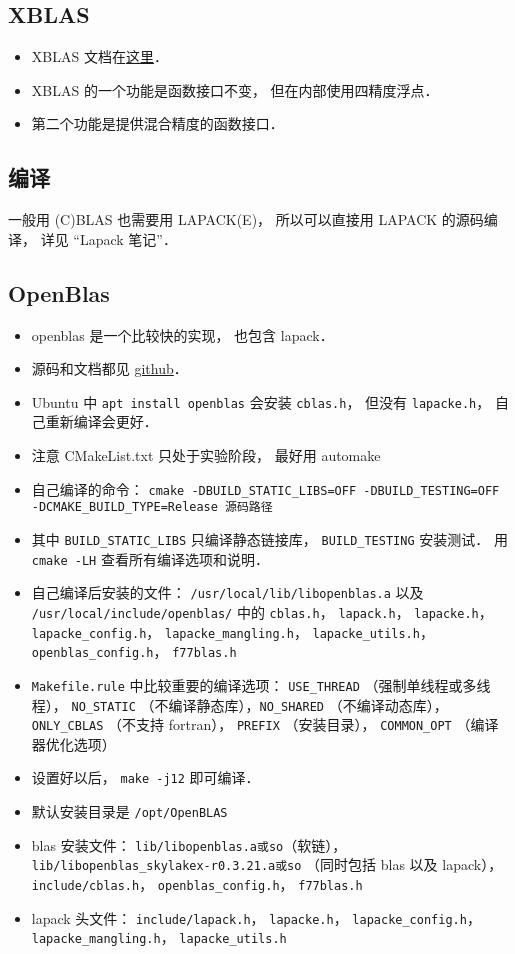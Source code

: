 \subsection{XBLAS}
\begin{itemize}
\item XBLAS 文档在\href{https://netlib.org/xblas/}{这里}．
\item XBLAS 的一个功能是函数接口不变， 但在内部使用四精度浮点．
\item 第二个功能是提供混合精度的函数接口．
\end{itemize}

\subsection{编译}
一般用 (C)BLAS 也需要用 LAPACK(E)， 所以可以直接用 LAPACK 的源码编译， 详见 “Lapack 笔记”．

\subsection{OpenBlas}
\begin{itemize}
\item openblas 是一个比较快的实现， 也包含 lapack．
\item 源码和文档都见 \href{https://github.com/xianyi/OpenBLAS}{github}．
\item Ubuntu 中 \verb|apt install openblas| 会安装 \verb|cblas.h|， 但没有 \verb|lapacke.h|， 自己重新编译会更好．
\item 注意 CMakeList.txt 只处于实验阶段， 最好用 automake
\item 自己编译的命令： \verb|cmake -DBUILD_STATIC_LIBS=OFF -DBUILD_TESTING=OFF -DCMAKE_BUILD_TYPE=Release 源码路径|
\item 其中 \verb|BUILD_STATIC_LIBS| 只编译静态链接库， \verb|BUILD_TESTING| 安装测试． 用 \verb|cmake -LH| 查看所有编译选项和说明．
\item 自己编译后安装的文件： \verb|/usr/local/lib/libopenblas.a| 以及 \verb|/usr/local/include/openblas/| 中的 \verb|cblas.h|， \verb|lapack.h|， \verb|lapacke.h|， \verb|lapacke_config.h|， \verb|lapacke_mangling.h|， \verb|lapacke_utils.h|， \verb|openblas_config.h|， \verb|f77blas.h|
\item \verb|Makefile.rule| 中比较重要的编译选项： \verb|USE_THREAD| （强制单线程或多线程）， \verb|NO_STATIC| （不编译静态库），\verb|NO_SHARED| （不编译动态库）， \verb|ONLY_CBLAS| （不支持 fortran）， \verb|PREFIX| （安装目录）， \verb|COMMON_OPT| （编译器优化选项）
\item 设置好以后， \verb|make -j12| 即可编译．
\item 默认安装目录是 \verb|/opt/OpenBLAS|
\item blas 安装文件： \verb|lib/libopenblas.a或so|（软链）， \verb|lib/libopenblas_skylakex-r0.3.21.a或so| （同时包括 blas 以及 lapack）， \verb|include/cblas.h|， \verb|openblas_config.h|， \verb|f77blas.h|
\item lapack 头文件： \verb|include/lapack.h|， \verb|lapacke.h|， \verb|lapacke_config.h|， \verb|lapacke_mangling.h|， \verb|lapacke_utils.h|
\end{itemize}
